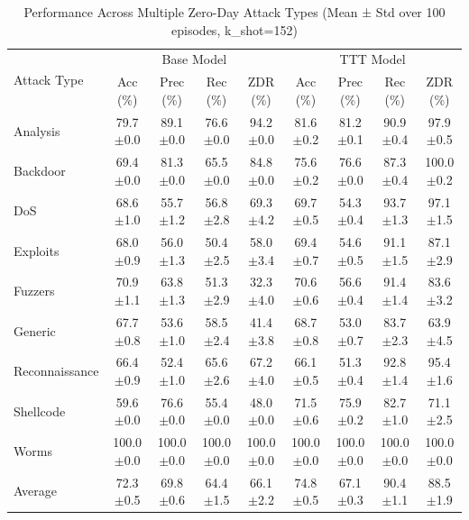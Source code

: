 
\begin{table}[ht]
\centering
\caption{Performance Across Multiple Zero-Day Attack Types (Mean ± Std over 100 episodes, k\_shot=152)}
\label{tab:multi_attack_ablation}
\begin{tabular}{l|cccc|cccc}
\hline
\multirow{2}{*}{Attack Type} & \multicolumn{4}{c|}{Base Model} & \multicolumn{4}{c}{TTT Model} \\
 & Acc (\%) & Prec (\%) & Rec (\%) & ZDR (\%) & Acc (\%) & Prec (\%) & Rec (\%) & ZDR (\%) \\
\hline
Analysis & 79.7$\pm$0.0 & 89.1$\pm$0.0 & 76.6$\pm$0.0 & 94.2$\pm$0.0 & 81.6$\pm$0.2 & 81.2$\pm$0.1 & 90.9$\pm$0.4 & 97.9$\pm$0.5 \\
Backdoor & 69.4$\pm$0.0 & 81.3$\pm$0.0 & 65.5$\pm$0.0 & 84.8$\pm$0.0 & 75.6$\pm$0.2 & 76.6$\pm$0.0 & 87.3$\pm$0.4 & 100.0$\pm$0.2 \\
DoS & 68.6$\pm$1.0 & 55.7$\pm$1.2 & 56.8$\pm$2.8 & 69.3$\pm$4.2 & 69.7$\pm$0.5 & 54.3$\pm$0.4 & 93.7$\pm$1.3 & 97.1$\pm$1.5 \\
Exploits & 68.0$\pm$0.9 & 56.0$\pm$1.3 & 50.4$\pm$2.5 & 58.0$\pm$3.4 & 69.4$\pm$0.7 & 54.6$\pm$0.5 & 91.1$\pm$1.5 & 87.1$\pm$2.9 \\
Fuzzers & 70.9$\pm$1.1 & 63.8$\pm$1.3 & 51.3$\pm$2.9 & 32.3$\pm$4.0 & 70.6$\pm$0.6 & 56.6$\pm$0.4 & 91.4$\pm$1.4 & 83.6$\pm$3.2 \\
Generic & 67.7$\pm$0.8 & 53.6$\pm$1.0 & 58.5$\pm$2.4 & 41.4$\pm$3.8 & 68.7$\pm$0.8 & 53.0$\pm$0.7 & 83.7$\pm$2.3 & 63.9$\pm$4.5 \\
Reconnaissance & 66.4$\pm$0.9 & 52.4$\pm$1.0 & 65.6$\pm$2.6 & 67.2$\pm$4.0 & 66.1$\pm$0.5 & 51.3$\pm$0.4 & 92.8$\pm$1.4 & 95.4$\pm$1.6 \\
Shellcode & 59.6$\pm$0.0 & 76.6$\pm$0.0 & 55.4$\pm$0.0 & 48.0$\pm$0.0 & 71.5$\pm$0.6 & 75.9$\pm$0.2 & 82.7$\pm$1.0 & 71.1$\pm$2.5 \\
Worms & 100.0$\pm$0.0 & 100.0$\pm$0.0 & 100.0$\pm$0.0 & 100.0$\pm$0.0 & 100.0$\pm$0.0 & 100.0$\pm$0.0 & 100.0$\pm$0.0 & 100.0$\pm$0.0 \\
\hline
Average & 72.3$\pm$0.5 & 69.8$\pm$0.6 & 64.4$\pm$1.5 & 66.1$\pm$2.2 & 74.8$\pm$0.5 & 67.1$\pm$0.3 & 90.4$\pm$1.1 & 88.5$\pm$1.9 \\
\hline
\end{tabular}
\end{table}
